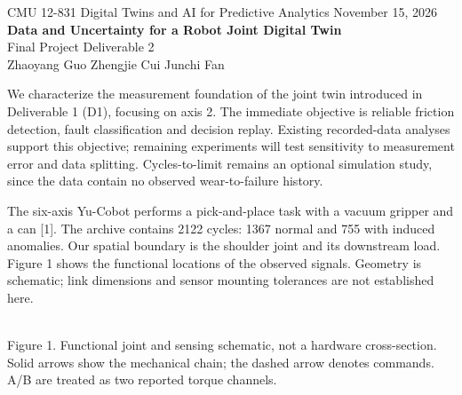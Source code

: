 \documentclass[10pt,letterpaper]{article}
\newcommand{\heading}[1]{\vspace{5pt}{\large\bfseries #1}\par\vspace{1pt}}
\begin{document}
{\small CMU 12-831 Digital Twins and AI for Predictive Analytics \hfill November 15, 2026}\\[4pt]
{\LARGE\bfseries Data and Uncertainty for a Robot Joint Digital Twin}\\[4pt]
{\large Final Project Deliverable 2}\\[3pt]
Zhaoyang Guo \quad Zhengjie Cui \quad Junchi Fan

We characterize the measurement foundation of the joint twin introduced in Deliverable 1 (D1), focusing on axis 2. The immediate objective is reliable friction detection, fault classification and decision replay. Existing recorded-data analyses support this objective; remaining experiments will test sensitivity to measurement error and data splitting. Cycles-to-limit remains an optional simulation study, since the data contain no observed wear-to-failure history.

\heading{2.1 Physical System and Measurement Model}
The six-axis Yu-Cobot performs a pick-and-place task with a vacuum gripper and a can [1]. The archive contains 2122 cycles: 1367 normal and 755 with induced anomalies. Our spatial boundary is the shoulder joint and its downstream load. Figure 1 shows the functional locations of the observed signals. Geometry is schematic; link dimensions and sensor mounting tolerances are not established here.

\begin{center}
\\[-2pt]
{\footnotesize Figure 1. Functional joint and sensing schematic, not a hardware cross-section. Solid arrows show the mechanical chain; the dashed arrow denotes commands. A/B are treated as two reported torque channels.}
\end{center}
\end{document}
